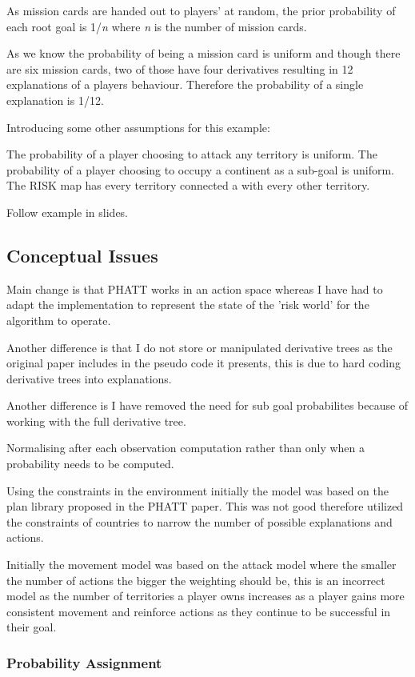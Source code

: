 \documentclass[parskip]{cs4rep}
\begin{document}
As mission cards are handed out to players' at random, the prior probability of each root goal is 1/\textit{n} where \textit{n} is the number of mission cards.

As we know the probability of being a mission card is uniform and though there are six mission cards, two of those have four derivatives resulting in 12 explanations of a players behaviour. Therefore the probability of a single explanation is 1/12.

Introducing some other assumptions for this example:

The probability of a player choosing to attack any territory is uniform.
The probability of a player choosing to occupy a continent as a sub-goal is uniform.
The RISK map has every territory connected a with every other territory.

Follow example in slides.

\subsection{Conceptual Issues}

Main change is that PHATT works in an action space whereas I have had to adapt the implementation to represent the state of the 'risk world' for the algorithm to operate.

Another difference is that I do not store or manipulated derivative trees as the original paper includes in the pseudo code it presents, this is due to hard coding derivative trees into explanations.

Another difference is I have removed the need for sub goal probabilites because of working with the full derivative tree.

Normalising after each observation computation rather than only when a probability needs to be computed.

Using the constraints in the environment initially the model was based on the plan library proposed in the PHATT paper. This was not good therefore utilized the constraints of countries to narrow the number of possible explanations and actions.

Initially the movement model was based on the attack model where the smaller the number of actions the bigger the weighting should be, this is an incorrect model as the number of territories a player owns increases as a player gains more consistent movement and reinforce actions as they continue to be successful in their goal.

\subsubsection{Probability Assignment}
\end{document}
